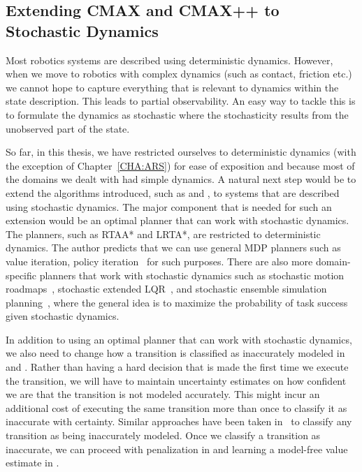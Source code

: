\subsection{Extending CMAX and CMAX++ to Stochastic Dynamics}
\label{sec:extend-cmax-cmaxpp}

Most robotics systems are described using deterministic
dynamics. However, when we move to robotics with complex dynamics
(such as contact, friction etc.) we cannot hope to capture everything
that is relevant to dynamics within the state description. This leads
to partial observability. An easy way to tackle this is to formulate
the dynamics as stochastic where the stochasticity results from the
unobserved part of the state.

So far, in this thesis, we have restricted ourselves to deterministic
dynamics (with the exception of Chapter~\ref{CHA:ARS}) for ease of
exposition and because most of the domains we dealt with had simple
dynamics. A natural next step would be to extend the algorithms
introduced, such as \cmax{} and \cmaxpp{}, to systems that are
described using stochastic dynamics. The major component that is
needed for such an extension would be an optimal planner that can work
with stochastic dynamics. The planners, such as RTAA* and LRTA*, are
restricted to deterministic dynamics. The author predicts that we can
use general MDP planners such as value iteration, policy
iteration~\cite{sutton1998introduction} for such purposes. There are
also more domain-specific planners that work with stochastic dynamics
such as stochastic motion
roadmaps~\cite{DBLP:conf/rss/AlterovitzSG07}, stochastic extended
LQR~\cite{DBLP:journals/tase/SunBA16}, and stochastic ensemble
simulation planning~\cite{DBLP:conf/iros/ChiangRT16}, where the
general idea is to maximize the probability of task success given
stochastic dynamics.

In addition to using an optimal planner that can work with stochastic
dynamics, we also need to change how a transition is classified as
inaccurately modeled in \cmax{} and \cmaxpp{}. Rather than having a
hard decision that is made the first time we execute the transition,
we will have to maintain uncertainty estimates on how confident we are
that the transition is not modeled accurately. This might incur an
additional cost of executing the same transition more than once to
classify it as inaccurate with certainty. Similar approaches have been
taken in~\cite{DBLP:conf/nips/KidambiRNJ20,
  DBLP:conf/nips/YuTYEZLFM20} to classify any transition 
as being inaccurately modeled. Once we classify a transition as
inaccurate, we can proceed with penalization in \cmax{} and learning a
model-free value estimate in \cmaxpp{}.

